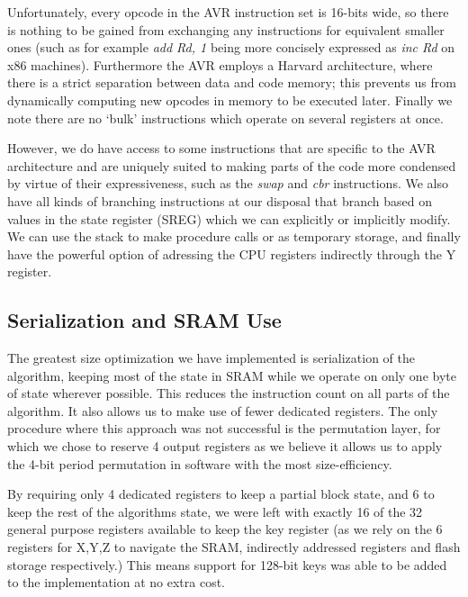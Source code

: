 \documentclass[11pt]{llncs2e} %
\begin{document}
Unfortunately, every opcode in the AVR instruction set is 16-bits wide, so there is nothing to be gained from exchanging any instructions for equivalent smaller ones (such as for example \textit{add Rd, 1} being more concisely expressed as \textit{inc Rd} on x86 machines).
Furthermore the AVR employs a Harvard architecture, where there is a strict separation between data and code memory; this prevents us from dynamically computing new opcodes in memory to be executed later.
Finally we note there are no `bulk' instructions which operate on several registers at once.

However, we do have access to some instructions that are specific to the AVR architecture and are uniquely suited to making parts of the code more condensed by virtue of their expressiveness, such as the \textit{swap} and \textit{cbr} instructions.
We also have all kinds of branching instructions at our disposal that branch based on values in the state register (SREG) which we can explicitly or implicitly modify.
We can use the stack to make procedure calls or as temporary storage, and finally have the powerful option of adressing the CPU registers indirectly through the Y register.

\subsection{Serialization and SRAM Use}
The greatest size optimization we have implemented is serialization of the algorithm, keeping most of the state in SRAM while we operate on only one byte of state wherever possible.
This reduces the instruction count on all parts of the algorithm.
It also allows us to make use of fewer dedicated registers. %
The only procedure where this approach was not successful is the permutation layer, for which we chose to reserve 4 output registers as we believe it allows us to apply the 4-bit period permutation in software with the most size-efficiency.

By requiring only 4 dedicated registers to keep a partial block state, and 6 to keep the rest of the algorithms state, we were left with exactly 16 of the 32 general purpose registers available to keep the key register (as we rely on the 6 registers for X,Y,Z to navigate the SRAM, indirectly addressed registers and flash storage respectively.)
This means support for 128-bit keys was able to be added to the implementation at no extra cost.
\end{document}
